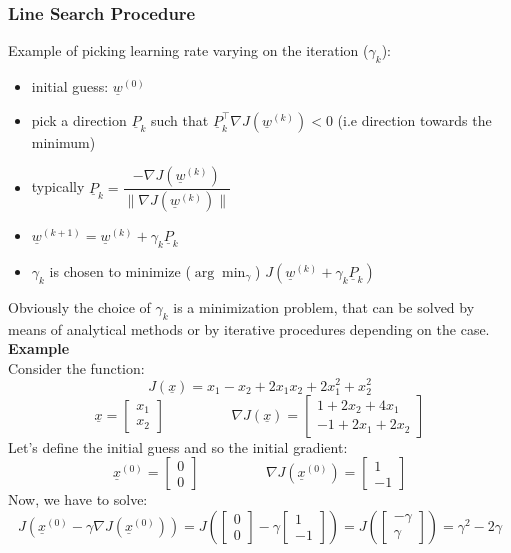 \subsubsection*{Line Search Procedure}
Example of picking learning rate varying on the iteration ($\gamma_k$):
\begin{itemize}
    \item initial guess: $\underline{w}^{(0)}$
    \item pick a direction $\underline{P}_k$ such that $\underline{P}_k^\intercal \nabla J(\underline{w}^{(k)}) < 0$ (i.e direction towards the minimum)
    \item typically $\underline{P}_k = \dfrac{-\nabla J(\underline{w}^{(k)})}{\|\nabla J(\underline{w}^{(k)})\|}$
    \item $\underline{w}^{(k+1)} = \underline{w}^{(k)} + \gamma_k\underline{P}_k$
    \item $\gamma_k$ is chosen to minimize ($\arg\min_{\gamma}$) $J(\underline{w}^{(k)} + \gamma_k\underline{P}_k)$
\end{itemize}
Obviously the choice of $\gamma_k$ is a minimization problem, that can be solved by means of analytical methods or by iterative procedures depending on the case. \\
\textbf{Example}\\
Consider the function:
\[J(\underline{x}) = x_1 - x_2 + 2x_1x_2 + 2x_1^2 + x_2^2\]
\[
    \underline{x} = \begin{bmatrix}
        x_1\\x_2
    \end{bmatrix} \hspace{2cm}
    \nabla J(\underline{x}) = \begin{bmatrix}
        1 + 2x_2 + 4x_1\\-1 + 2x_1 + 2x_2
    \end{bmatrix}    
\]
Let's define the initial guess and so the initial gradient:
\[
    \underline{x}^{(0)} = 
    \begin{bmatrix}
        0\\0
    \end{bmatrix} \hspace{2cm}
    \nabla J(\underline{x}^{(0)}) =
    \begin{bmatrix}
        1\\-1
    \end{bmatrix}    
\]
Now, we have to solve:
\[
    J(\underline{x}^{(0)} - \gamma \nabla J(\underline{x}^{(0)})) = J\left(  
        \begin{bmatrix}
            0\\0
        \end{bmatrix}-
        \gamma 
        \begin{bmatrix}
            1\\-1
        \end{bmatrix}
    \right) = J\left(  
        \begin{bmatrix}
            -\gamma\\
            \gamma
        \end{bmatrix}
        \right) = \gamma^2 - 2\gamma
\]
